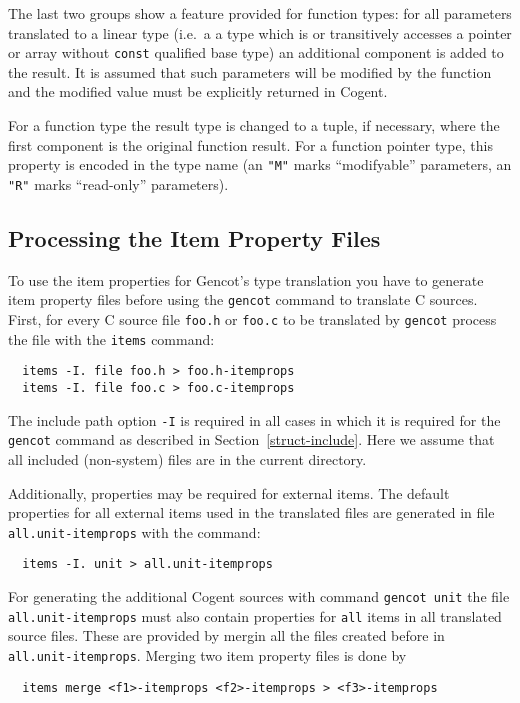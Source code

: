 \documentclass[a4paper]{report}
\newcommand{\code}[1]{\textnormal{\texttt{#1}}}
\begin{document}
The last two groups show a feature provided for function types: for all parameters translated to a linear type (i.e.~a
a type which is or transitively accesses a pointer or array without \code{const} qualified base type) an additional
component is added to the result. It is assumed that such parameters will be modified by the function and the modified
value must be explicitly returned in Cogent.

For a function type the result type is changed to a tuple, if necessary, where the first component is the original 
function result. For a function pointer type, this property is encoded in the type name (an \code{"M"} marks 
``modifyable'' parameters, an \code{"R"} marks ``read-only'' parameters).

\subsection{Processing the Item Property Files}
\label{types-dfltprops-process}

To use the item properties for Gencot's type translation you have to generate item property files before using the 
\code{gencot} command to translate C sources. First, for every C source file \code{foo.h} or \code{foo.c} 
to be translated by \code{gencot} process the file with the \code{items} command:
\begin{verbatim}
  items -I. file foo.h > foo.h-itemprops
  items -I. file foo.c > foo.c-itemprops
\end{verbatim}
The include path option \code{-I} is required in all cases in which it is required for the \code{gencot} command as 
described in Section~\ref{struct-include}. Here we assume that all included (non-system) files are in the current 
directory.

Additionally, properties may be required for external items. The default properties for all external items used in the 
translated files are generated in file \code{all.unit-itemprops} with the command:
\begin{verbatim}
  items -I. unit > all.unit-itemprops
\end{verbatim}

For generating the additional Cogent sources with command \code{gencot unit} the file \code{all.unit-itemprops} must
also contain properties for \code{all} items in all translated source files. These are provided by mergin all the files created 
before in \code{all.unit-itemprops}. Merging two item property files is done by 
\begin{verbatim}
  items merge <f1>-itemprops <f2>-itemprops > <f3>-itemprops
\end{verbatim}
\end{document}
